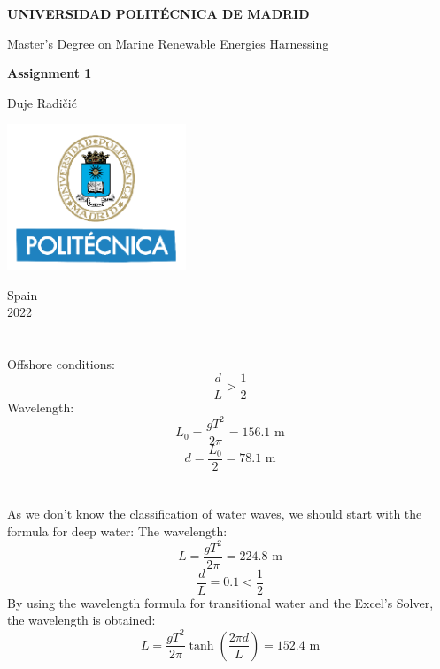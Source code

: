 \documentclass[a4paper,12pt]{article}
\begin{document}
\begin{titlepage}
    \begin{center}
        \Huge
        \textbf{UNIVERSIDAD POLITÉCNICA DE MADRID}
        
        \LARGE
        Master’s Degree on Marine Renewable Energies Harnessing
            
        \vspace{3 cm}
            
        \textbf{Assignment 1}
            
        \vspace{3cm}
        
        Duje Radičić
        
        \vspace{2cm}
        
        \includegraphics[width=0.4\textwidth]{UPM.png}
        
        \vspace{1cm}
        
        Spain\\
        2022
            
    \end{center}
\end{titlepage}

\section{}

Offshore conditions:
\[
\frac{d}{L} > \frac{1}{2}
\]
Wavelength:
\[
L_0 = \frac{g T^2}{2 \pi} = 156.1 \textrm{ m}
\]
\[
d = \frac{L_0}{2} = 78.1 \textrm{ m}
\]

\section{}

As we don't know the classification of water waves, we should start with the formula for deep water:
The wavelength:
\[
L = \frac{g T^2}{2 \pi} = 224.8 \textrm{ m}
\]
\[
\frac{d}{L} = 0.1 < \frac{1}{2}
\]
By using the wavelength formula for transitional water and the Excel's Solver, the wavelength is obtained:
\[
L = \frac{g T^2}{2 \pi} \tanh(\frac{2 \pi d}{L}) = 152.4 \textrm{ m}
\]
\end{document}
